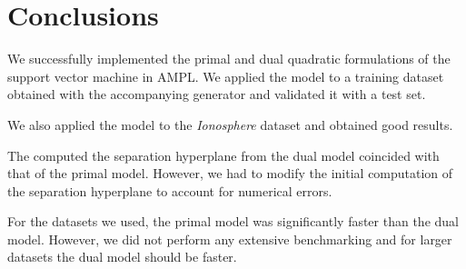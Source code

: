 










\chapter*{Conclusions}
We successfully implemented the primal and dual quadratic formulations of the support vector machine in AMPL.
We applied the model to a training dataset obtained with the accompanying generator and validated
it with a test set.

We also applied the model to the \emph{Ionosphere} dataset and obtained good results.

The computed the separation hyperplane from the dual model coincided with that of the primal model.
However, we had to modify the initial computation of the separation hyperplane to account
for numerical errors.

For the datasets we used, the primal model was significantly faster than the dual model. However,
we did not perform any extensive benchmarking and for larger datasets the dual model should be faster.

\nocite{*}

\printbibliography


